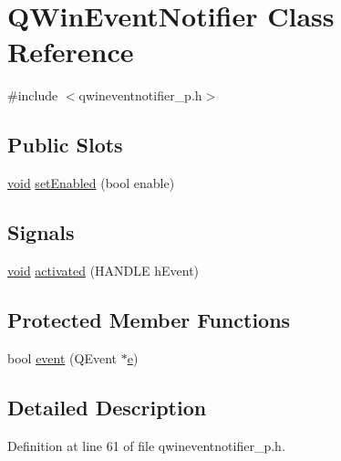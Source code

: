 \hypertarget{class_q_win_event_notifier}{\section{\-Q\-Win\-Event\-Notifier \-Class \-Reference}
\label{class_q_win_event_notifier}
}


{\ttfamily \#include $<$qwineventnotifier\-\_\-p.\-h$>$}

\subsection*{\-Public \-Slots}
\begin{DoxyCompactItemize}
\item 
\hyperlink{group___u_a_v_objects_plugin_ga444cf2ff3f0ecbe028adce838d373f5c}{void} \hyperlink{class_q_win_event_notifier_a0e3b99bbb71807303bd5e7006b9baabf}{set\-Enabled} (bool enable)
\end{DoxyCompactItemize}
\subsection*{\-Signals}
\begin{DoxyCompactItemize}
\item 
\hyperlink{group___u_a_v_objects_plugin_ga444cf2ff3f0ecbe028adce838d373f5c}{void} \hyperlink{class_q_win_event_notifier_a2c2c7af7bee13c76f48d8fba2b2ba2ec}{activated} (\-H\-A\-N\-D\-L\-E h\-Event)
\end{DoxyCompactItemize}
\subsection*{\-Protected \-Member \-Functions}
\begin{DoxyCompactItemize}
\item 
bool \hyperlink{class_q_win_event_notifier_aac2618814439b3975e970515601a6cd0}{event} (\-Q\-Event $\ast$\hyperlink{_o_p_plots_8m_a9425be9aab51621e317ba7ade564b570}{e})
\end{DoxyCompactItemize}


\subsection{\-Detailed \-Description}


\-Definition at line 61 of file qwineventnotifier\-\_\-p.\-h.



